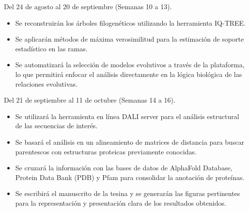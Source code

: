 Del 24 de agosto al 20 de septiembre (Semanas 10 a 13).
\begin{itemize}
	\item Se reconstruirán los árboles filogenéticos utilizando la herramienta IQ-TREE.
	\item Se aplicarán métodos de máxima verosimilitud para la estimación de soporte estadístico en las ramas.
	\item Se automatizará la selección de modelos evolutivos a través de la plataforma, lo que permitirá enfocar el análisis directamente en la lógica biológica de las relaciones evolutivas.
\end{itemize}

Del 21 de septiembre al 11 de octubre (Semanas 14 a 16).
\begin{itemize}
	\item Se utilizará la herramienta en línea DALI server para el análisis estructural de las secuencias de interés.
	\item Se basará el análisis en un alineamiento de matrices de distancia para buscar parentescos con estructuras proteicas previamente conocidas.
	\item Se cruzará la información con las bases de datos de AlphaFold Database, Protein Data Bank (PDB) y Pfam para consolidar la anotación de proteínas.
	\item Se escribirá el manuscrito de la tesina y se generarán las figuras pertinentes para la representación y presentación clara de los resultados obtenidos.
\end{itemize}